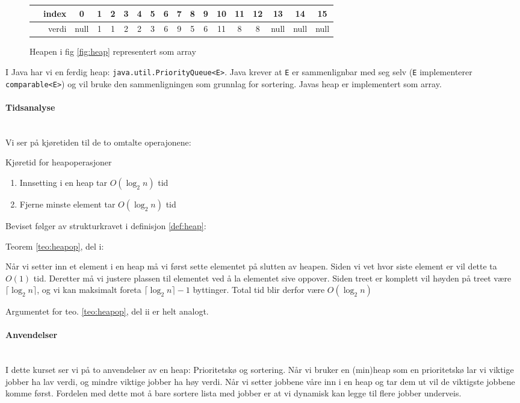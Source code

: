 \begin{figure}[H]
\centering
\caption{Heapen i fig \ref{fig:heap} representert som array}
\begin{tabular}{r||c|c|c|c|c|c|c|c|c|c|c|c|c|c|c|c}
	~~index &  0   & 1 & 2 & 3 & 4 & 5 & 6 & 7 & 8 & 9 & 10 & 11 & 12 &  13  &  14  &  15  \\ \hline
	~~verdi & null & 1 & 1 & 2 & 2 & 3 & 6 & 9 & 5 & 6 & 11 & 8  & 8  & null & null & null 
\end{tabular}
\end{figure}

I Java har vi en ferdig heap: \verb|java.util.PriorityQueue<E>|. Java krever at \verb|E| er sammenlignbar med seg selv (\verb|E| implementerer \verb|comparable<E>|) og vil bruke den sammenligningen som grunnlag for sortering. Javas heap er implementert som array. 

\paragraph{Tidsanalyse}~\\
Vi ser på kjøretiden til de to omtalte operajonene:
\begin{teorem} Kjøretid for heapoperasjoner \label{teo:heapop}
\begin{enumerate}[i]
\item Innsetting i en heap tar $ O(\log_2 n) $ tid
\item Fjerne minste element tar $ O(\log_2 n) $ tid
\end{enumerate}
\end{teorem}
Beviset følger av strukturkravet i definisjon \ref{def:heap}:
\begin{bevis} Teorem \ref{teo:heapop}, del i:

Når vi setter inn et element i en heap må vi først sette elementet på slutten av heapen. Siden vi vet hvor siste element er vil dette ta $ O(1) $ tid. Deretter må vi justere plassen til elementet ved å la elementet sive oppover. Siden treet er komplett vil høyden på treet være $ \lceil\log_2 n\rceil $, og vi kan maksimalt foreta $ \lceil\log_2 n\rceil - 1 $ byttinger. Total tid blir derfor være $ O(\log_2 n) $
\end{bevis}
Argumentet for teo. \ref{teo:heapop}, del ii er helt analogt. 


\paragraph{Anvendelser}~\\
I dette kurset ser vi på to anvendelser av en heap: Prioritetskø og sortering. Når vi bruker en (min)heap som en prioritetskø lar vi viktige jobber ha lav verdi, og mindre viktige jobber ha høy verdi. Når vi setter jobbene våre inn i en heap og tar dem ut vil de viktigste jobbene komme først. Fordelen med dette mot å bare sortere lista med jobber er at vi dynamisk kan legge til flere jobber underveis. 

